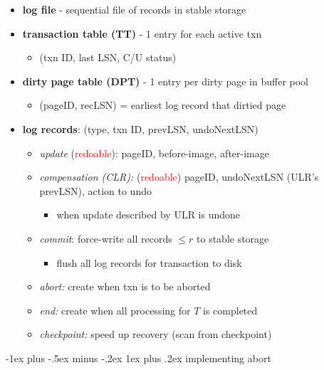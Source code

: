 \documentclass[10pt, landscape]{article}
\makeatletter
\renewcommand{\subsubsection}{\@startsection{subsubsection}{3}{0mm}%
  {-1ex plus -.5ex minus -.2ex}%
  {1ex plus .2ex}%
{\normalfont\small\bfseries}}%
\makeatother
\begin{document}
\begin{multicols*}{4}
  \begin{itemize}
    \item \textbf{log file} - sequential file of records in stable storage
    \item \textbf{transaction table (TT)} - 1 entry for each active txn
      \begin{itemize}
        \item (txn ID, last LSN, C/U status)
      \end{itemize}
    \item \textbf{dirty page table (DPT)} - 1 entry per dirty page in buffer pool
      \begin{itemize}
        \item (pageID, recLSN) = earliest log record that dirtied page
      \end{itemize}
    \item \textbf{log records}: (type, txn ID, prevLSN, undoNextLSN)
      \begin{itemize}
        \item \textit{update} (\attention \textcolor{red}{redoable}): pageID, before-image, after-image
        \item \textit{compensation (CLR):} (\attention \textcolor{red}{redoable}) pageID, undoNextLSN (ULR's prevLSN), action to undo
          \begin{itemize}
            \item when update described by ULR is undone
          \end{itemize}
        \item \textit{commit}: force-write all records $\leq r$ to stable storage
          \begin{itemize}
            \item flush all log records for transaction to disk
          \end{itemize}
        \item \textit{abort:} create when txn is to be aborted
        \item \textit{end:} create when all processing for $T$ is completed
        \item \textit{checkpoint:} speed up recovery (scan from checkpoint)
      \end{itemize}
  \end{itemize}

  \subsubsection{implementing abort}


\end{multicols*}
\end{document}
